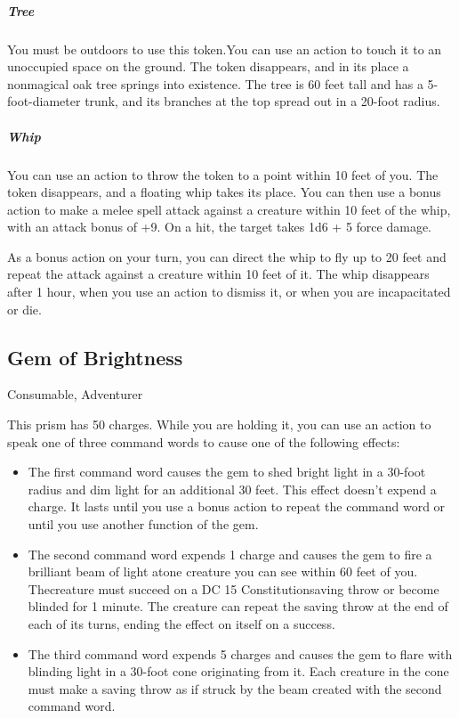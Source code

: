 \subparagraph*{Tree} You must be outdoors to use this token.You can use an action to touch it to an unoccupied space on the ground. The token disappears, and in its place a nonmagical oak tree springs into existence. The tree is 60 feet tall and has a 5-foot-diameter trunk, and its branches at the top spread out in a 20-foot radius.

\subparagraph*{Whip} You can use an action to throw the token to a point within 10 feet of you. The token disappears, and a floating whip takes its place. You can then use a bonus action to make a melee spell attack against a creature within 10 feet of the whip, with an attack bonus of +9. On a hit, the target takes 1d6 + 5 force damage.

As a bonus action on your turn, you can direct the whip to fly up to 20 feet and repeat the attack against a creature within 10 feet of it. The whip disappears after 1 hour, when you use an action to dismiss it, or when you are incapacitated or die.

\subsection{Gem of Brightness}
Consumable, Adventurer

This prism has 50 charges. While you are holding it, you can use an action to speak one of three command words to cause one of the following effects:
\begin{itemize}
\item The first command word causes the gem to shed bright light in a 30-foot radius and dim light for an additional 30 feet. This effect doesn't expend a charge. It lasts until you use a bonus action to repeat the command word or until you use another function of the gem.
\item The second command word expends 1 charge and causes the gem to fire a brilliant beam of light atone creature you can see within 60 feet of you. Thecreature must succeed on a DC 15 Constitutionsaving throw or become blinded for 1 minute. The creature can repeat the saving throw at the end of each of its turns, ending the effect on itself on a success.
\item The third command word expends 5 charges and causes the gem to flare with blinding light in a 30-foot cone originating from it. Each creature in the cone must make a saving throw as if struck by the beam created with the second command word.
\end{itemize}

